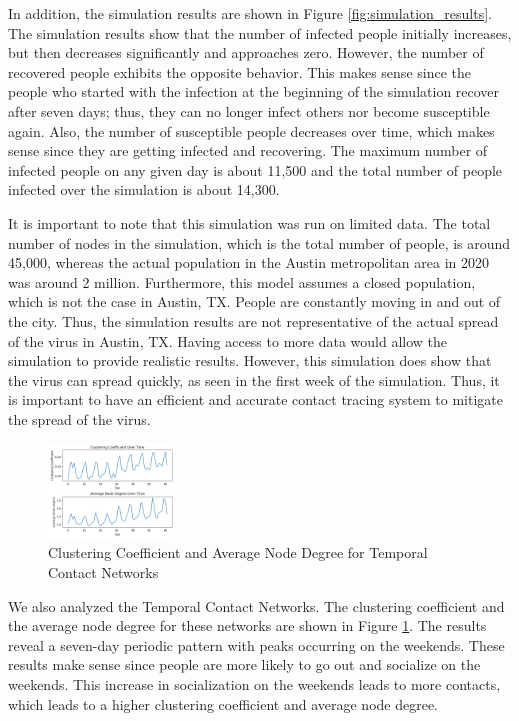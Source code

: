 \documentclass[times, 10pt,twocolumn]{article}
\begin{document}
In addition, the simulation results are shown in Figure \ref{fig:simulation_results}. The simulation results show that the number of infected people initially increases, but then decreases significantly and approaches zero. However, the number of recovered people exhibits the opposite behavior. This makes sense since the people who started with the infection at the beginning of the simulation recover after seven days; thus, they can no longer infect others nor become susceptible again. Also, the number of susceptible people decreases over time, which makes sense since they are getting infected and recovering. The maximum number of infected people on any given day is about 11,500 and the total number of people infected over the simulation is about 14,300.

It is important to note that this simulation was run on limited data. The total number of nodes in the simulation, which is the total number of people, is around 45,000, whereas the actual population in the Austin metropolitan area in 2020 was around 2 million. Furthermore, this model assumes a closed population, which is not the case in Austin, TX. People are constantly moving in and out of the city. Thus, the simulation results are not representative of the actual spread of the virus in Austin, TX.  Having access to more data would allow the simulation to provide realistic results. However, this simulation does show that the virus can spread quickly, as seen in the first week of the simulation. Thus, it is important to have an efficient and accurate contact tracing system to mitigate the spread of the virus.

\begin{figure}[h]
    \centering
    \includegraphics[width=0.3\textwidth]{imgs/temporal_network_analysis.png}
    \caption{Clustering Coefficient and Average Node Degree for Temporal Contact Networks} 
    \label{fig:temporal_stats}
\end{figure}

We also analyzed the Temporal Contact Networks. The clustering coefficient and the average node degree for these networks are shown in Figure \ref{fig:temporal_stats}. The results reveal a seven-day periodic pattern with peaks occurring on the weekends. These results make sense since people are more likely to go out and socialize on the weekends. This increase in socialization on the weekends leads to more contacts, which leads to a higher clustering coefficient and average node degree.
\end{document}
